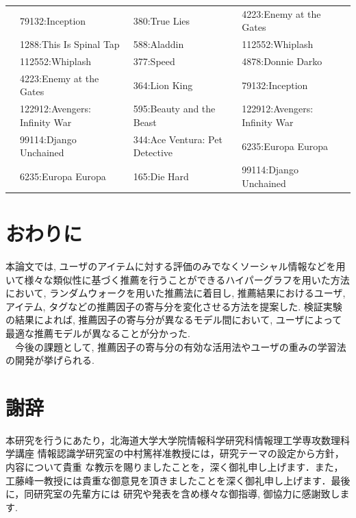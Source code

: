 \documentclass[a4j,11pt]{jarticle}           %
\begin{document}
\begin{table}[H]
{{\begin{tabular}{llll}
					&79132:Inception &380:True Lies &4223:Enemy at the Gates \\
					&1288:This Is Spinal Tap &588:Aladdin  &112552:Whiplash \\
					&112552:Whiplash &377:Speed &4878:Donnie Darko \\
					&4223:Enemy at the Gates &364:Lion King &79132:Inception \\
					&122912:Avengers: Infinity War &595:Beauty and the Beast &122912:Avengers: Infinity War \\
					&99114:Django Unchained &344:Ace Ventura: Pet Detective &6235:Europa Europa \\
					&6235:Europa Europa &165:Die Hard &99114:Django Unchained \\ \hline
				\end{tabular}
			}
		}
	\end{table}
	
	\newpage
	\section{おわりに}
	本論文では, ユーザのアイテムに対する評価のみでなくソーシャル情報などを用いて様々な類似性に基づく推薦を行うことができるハイパーグラフを用いた方法において, ランダムウォークを用いた推薦法に着目し, 推薦結果におけるユーザ, アイテム, タグなどの推薦因子の寄与分を変化させる方法を提案した. 検証実験の結果によれば, 推薦因子の寄与分が異なるモデル間において, ユーザによって最適な推薦モデルが異なることが分かった. \\　今後の課題として, 推薦因子の寄与分の有効な活用法やユーザの重みの学習法の開発が挙げられる.
	
	\newpage
	\section*{謝辞}
	本研究を行うにあたり，北海道大学大学院情報科学研究科情報理工学専攻数理科学講座
	情報認識学研究室の中村篤祥准教授には，研究テーマの設定から方針，内容について貴重
	な教示を賜りましたことを，深く御礼申し上げます．また，工藤峰一教授には貴重な御意見を頂きましたことを深く御礼申し上げます．最後に，同研究室の先輩方には
	研究や発表を含め様々な御指導, 御協力に感謝致します. 
	\newpage
	\small
		
\end{document}
